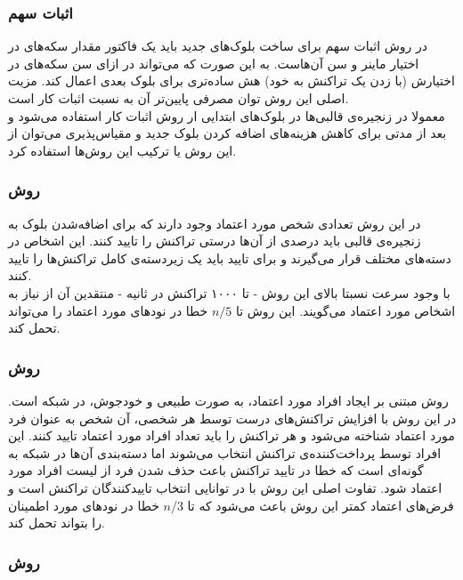 \subsubsection{اثبات سهم}
در روش اثبات سهم
\cite{PoS}
برای ساخت بلوک‌های جدید باید یک فاکتور مقدار سکه‌های در اختیار ماینر و سن آن‌هاست. به این صورت که می‌تواند در ازای سن‌ سکه‌های در اختیارش (با زدن یک تراکنش به خود) هش ساده‌تری برای بلوک بعدی اعمال کند. مزیت اصلی این روش توان مصرفی پایین‌تر آن به نسبت اثبات کار است. 
\\
معمولا در زنجیره‌ی قالبی‌ها در بلوک‌های ابتدایی ار روش اثبات کار استفاده می‌شود و بعد از مدتی برای کاهش هزینه‌های اضافه کردن بلوک جدید و مقیاس‌پذیری می‌توان از این روش یا ترکیب این روش‌ها استفاده کرد.

\subsubsection{روش }
در این روش
\cite{ripple} \cite{ripple2}
 تعدادی شخص مورد اعتماد وجود دارند که برای اضافه‌شدن بلوک به زنجیره‌ی قالبی باید درصدی از آن‌ها درستی تراکنش را تایید کنند. این اشخاص در دسته‌های مختلف قرار می‌گیرند و برای تایید باید یک زیردسته‌ی کامل تراکنش‌ها را تایید کنند.
 \\
 با وجود سرعت نسبتا بالای این روش - تا ۱۰۰۰ تراکنش در ثانیه - منتقدین آن از نیاز به اشخاص مورد اعتماد می‌گویند. این روش تا $ n /5 $ خطا در نود‌های مورد اعتماد را می‌تواند تحمل کند.


\subsubsection{روش }
 روش 
\cite{scp}
 مبتنی بر ایجاد افراد مورد اعتماد، به صورت طبیعی و خودجوش، در شبکه است. در این روش با افزایش تراکنش‌های درست توسط هر شخصی، آن شخص به عنوان فرد مورد اعتماد شناخته می‌شود و هر تراکنش را باید تعداد افراد مورد اعتماد تایید کنند. این افراد توسط پرداخت‌کننده‌ی تراکنش انتخاب می‌شوند اما دسته‌بندی آن‌ها در شبکه‌ به گونه‌ای است که خطا در تایید تراکنش باعث حذف شدن فرد از لیست افراد مورد اعتماد شود. تفاوت اصلی این روش با 
 در توانایی انتخاب تاییدکنندگان تراکنش است و فرض‌های اعتماد کمتر این روش باعث می‌شود که تا $ n /3 $ خطا در نود‌های مورد اطمینان را بتواند تحمل کند.
 
 \subsubsection{روش }
 
